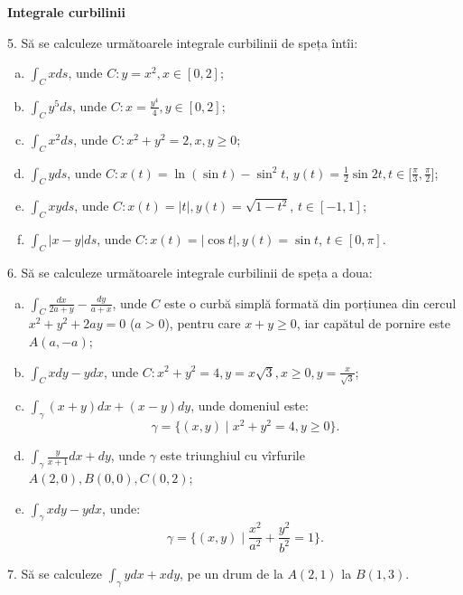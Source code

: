 \documentclass[11pt,a4paper]{article}
\theoremstyle{dotless}
\theoremstyle{dotlessdr}
\begin{document}
\vspace{2cm}



\textbf{Integrale curbilinii}

5. Să se calculeze următoarele integrale curbilinii de speța întîi:
\begin{enumerate}[(a)]
\item $ \int_C x ds$, unde $C: y = x^2, x \in [0, 2] $;
\item $ \int_C y^5 ds$, unde $C: x = \frac{y^4}{4}, y \in [0, 2] $;
\item $ \int_C x^2 ds$, unde $C: x^2 + y^2 = 2, x, y \geq 0 $;
\item $ \int_C yds$, unde $C: x(t) = \ln(\sin t) - \sin^2 t $,
  $y(t) = \frac{1}{2} \sin 2t, t \in \big[ \frac{\pi}{3}, \frac{\pi}{2} \big]$;
\item $ \int_C xyds$, unde $C: x(t) = |t|, y(t) = \sqrt{1 - t^2}$, $t \in [-1, 1] $;
\item $ \int_C |x - y| ds$, unde $C: x(t) = |\cos t|, y(t) = \sin t$, $t \in [0, \pi] $.
\end{enumerate}

\vspace{1cm}

6. Să se calculeze următoarele integrale curbilinii de speța a doua:
\begin{enumerate}[(a)]
\item $ \int_C \frac{dx}{2a + y} - \frac{dy}{a + x}$, unde $C$ este o curbă
  simplă formată din porțiunea din cercul $x^2 + y^2 + 2ay = 0$ ($a > 0$),
  pentru care $x + y \geq 0$, iar capătul de pornire este $A(a, -a)$;
\item $\int_C xdy - ydx$, unde $C: x^2 + y^2 = 4, y = x \sqrt{3}, x \geq 0, %
  y = \frac{x}{\sqrt{3}}$;
\item $\int_\gamma (x + y) dx + (x - y) dy$, unde domeniul este:
  \[
    \gamma = \{(x, y) \mid x^2 + y^2 = 4, y \geq 0\}.
  \]
\item $\int_\gamma \frac{y}{x + 1} dx + dy$, unde $\gamma$ este triunghiul cu
  vîrfurile $A(2, 0), B(0, 0), C(0, 2)$;
\item $\int_\gamma xdy - ydx$, unde:
  \[
    \gamma = \{(x, y) \mid \frac{x^2}{a^2} + \frac{y^2}{b^2} = 1 \}.
  \]
\end{enumerate}

\vspace{1cm}

7. Să se calculeze $\int_\gamma ydx + xdy$, pe un drum de la $A(2, 1)$
la $B(1, 3)$.
\end{document}
